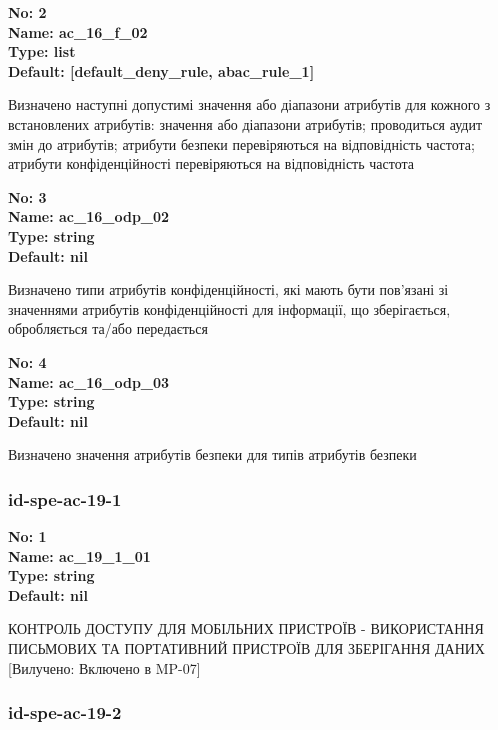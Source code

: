\documentclass{article}
\begin{document}
{\footnotesize\bfseries
No: 2\\
Name: ac\_\allowbreak{}16\_\allowbreak{}f\_\allowbreak{}02\\
Type: list\\
Default: [\textquotedbl{}default\_\allowbreak{}deny\_\allowbreak{}rule\textquotedbl{}, \textquotedbl{}abac\_\allowbreak{}rule\_\allowbreak{}1\textquotedbl{}]
}

{\footnotesize Визначено наступні допустимі значення або діапазони атрибутів для кожного з встановлених атрибутів: значення або діапазони атрибутів; проводиться аудит змін до атрибутів; атрибути безпеки перевіряються на відповідність частота; атрибути конфіденційності перевіряються на відповідність частота}


{\footnotesize\bfseries
No: 3\\
Name: ac\_\allowbreak{}16\_\allowbreak{}odp\_\allowbreak{}02\\
Type: string\\
Default: nil
}

{\footnotesize Визначено типи атрибутів конфіденційності, які мають бути пов'язані зі значеннями атрибутів конфіденційності для інформації, що зберігається, обробляється та/або передається}


{\footnotesize\bfseries
No: 4\\
Name: ac\_\allowbreak{}16\_\allowbreak{}odp\_\allowbreak{}03\\
Type: string\\
Default: nil
}

{\footnotesize Визначено значення атрибутів безпеки для типів атрибутів безпеки}




\subsubsection{id-spe-ac-19-1}


\vspace{10pt}
{\footnotesize\bfseries
No: 1\\
Name: ac\_\allowbreak{}19\_\allowbreak{}1\_\allowbreak{}01\\
Type: string\\
Default: nil
}

{\footnotesize КОНТРОЛЬ ДОСТУПУ ДЛЯ МОБІЛЬНИХ ПРИСТРОЇВ - ВИКОРИСТАННЯ ПИСЬМОВИХ ТА ПОРТАТИВНИЙ ПРИСТРОЇВ ДЛЯ ЗБЕРІГАННЯ ДАНИХ [Вилучено: Включено в MP-07]}




\subsubsection{id-spe-ac-19-2}
\end{document}

